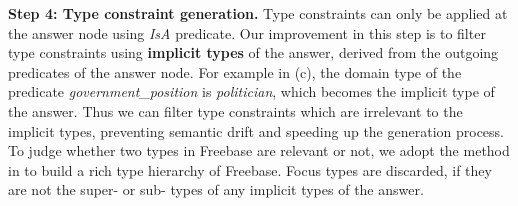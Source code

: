 \textbf{Step 4: Type constraint generation.}
Type constraints can only be applied at the answer node using \textit{IsA} predicate.
Our improvement in this step is to filter type constraints
using \textbf{implicit types} of the answer, derived from the outgoing predicates 
of the answer node.
For example in (c), 
the domain type of the predicate \textit{government\_position}
is \textit{politician}, which becomes the implicit type of the answer.
Thus we can filter type constraints which are irrelevant to the implicit types,
preventing semantic drift and speeding up the generation process.
To judge whether two types in Freebase are relevant or not,
we adopt the method in \citet{luo2015inferring} to build a rich type hierarchy of Freebase.
Focus types are discarded, if they are not the super- or sub- types
of any implicit types of the answer.


